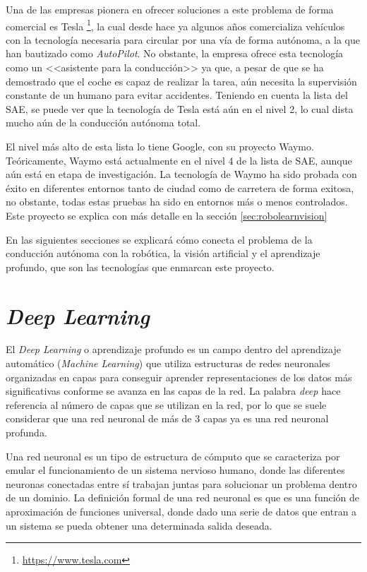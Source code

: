 Una de las empresas pionera en ofrecer soluciones a este problema de forma comercial es Tesla \footnote{\url{https://www.tesla.com}}, la cual desde hace ya algunos años comercializa vehículos con la tecnología necesaria para circular por una vía de forma autónoma, a la que han bautizado como \textit{AutoPilot}. No obstante, la empresa ofrece esta tecnología como un <<asistente para la conducción>> ya que, a pesar de que se ha demostrado que el coche es capaz de realizar la tarea, aún necesita la supervisión constante de un humano para evitar accidentes. Teniendo en cuenta la lista del SAE, se puede ver que la tecnología de Tesla está aún en el nivel 2, lo cual dista mucho aún de la conducción autónoma total.

El nivel más alto de esta lista lo tiene Google, con su proyecto Waymo. Teóricamente, Waymo está actualmente en el nivel 4 de la lista de SAE, aunque aún está en etapa de investigación. La tecnología de Waymo ha sido probada con éxito en diferentes entornos tanto de ciudad como de carretera de forma exitosa, no obstante, todas estas pruebas ha sido en entornos más o menos controlados. Este proyecto se explica con más detalle en la sección \ref{sec:robolearnvision}

En las siguientes secciones se explicará cómo conecta el problema de la conducción autónoma con la robótica, la visión artificial y el aprendizaje profundo, que son las tecnologías que enmarcan este proyecto.

\section{\textit{Deep Learning}}

El \textit{Deep Learning} o aprendizaje profundo es un campo dentro del aprendizaje automático (\textit{Machine Learning}) que utiliza estructuras de redes neuronales organizadas en capas para conseguir aprender representaciones de los datos más significativas conforme se avanza en las capas de la red. La palabra \textit{deep} hace referencia al número de capas que se utilizan en la red, por lo que se suele considerar que una red neuronal de más de 3 capas ya es una red neuronal profunda.

Una red neuronal es un tipo de estructura de cómputo que se caracteriza por emular el funcionamiento de un sistema nervioso humano, donde las diferentes neuronas conectadas entre sí trabajan juntas para solucionar un problema dentro de un dominio. La definición formal de una red neuronal es que es una función de aproximación de funciones universal, donde dado una serie de datos que entran a un sistema se pueda obtener una determinada salida deseada.

